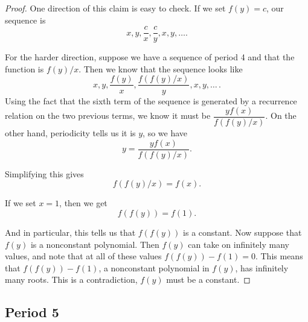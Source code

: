 \documentclass[12pt]{article}
\begin{document}
\begin{proof}
One direction of this claim is easy to check. If we set $f(y) = c$, our sequence is
\[x,y, \frac{c}{x}, \frac{c}{y}, x, y, \dots .\]

For the harder direction, suppose we have a sequence of period 4 and that the function is $f(y)/x$. Then we know that the sequence looks like
\begin{equation*}
x, y, \dfrac{f(y)}{x}, \dfrac{f(f(y)/x)}{y}, x, y, \dots \, .
\end{equation*}
Using the fact that the sixth term of the sequence is generated by a recurrence relation on the two previous terms, we know it must be $\dfrac{yf(x)}{f(f(y)/x)}$. On the other hand, periodicity tells us it is $y$, so we have
\[ y = \dfrac{yf(x)}{f(f(y)/x)}.\]

Simplifying this gives
\[ f(f(y)/x) = f(x). \]

If we set $x = 1$, then we get
\[ f(f(y)) = f(1). \]

And in particular, this tells us that $f(f(y))$ is a constant. Now suppose that $f(y)$ is a nonconstant polynomial. Then $f(y)$ can take on infinitely many values, and note that at all of these values $f(f(y)) - f(1) = 0$. This means that $f(f(y)) - f(1)$, a nonconstant polynomial in $f(y)$, has infinitely many roots. This is a contradiction, $f(y)$ must be a constant.
\end{proof}

\subsection{Period 5}
\end{document}
